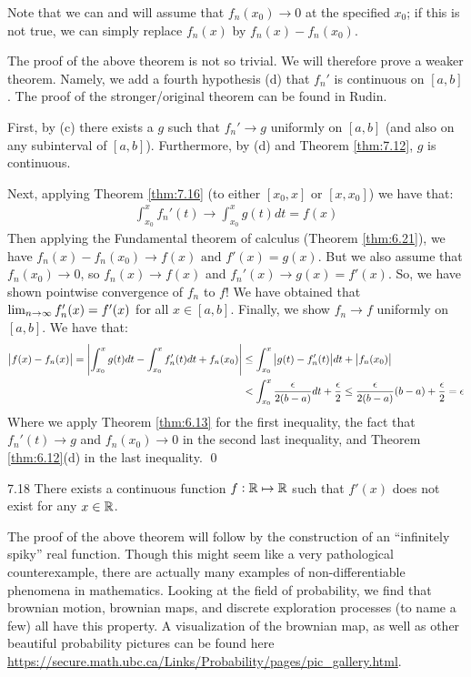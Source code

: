 Note that we can and will assume that $f_n(x_0) \rightarrow 0$ at the specified $x_0$; if this is not true, we can simply replace $f_n(x)$ by $f_n(x) - f_n(x_0)$.

\begin{nproof}
    The proof of the above theorem is not so trivial. We will therefore prove a weaker theorem. Namely, we add a fourth hypothesis (d) that $f_n'$ is continuous on $[a, b]$. The proof of the stronger/original theorem can be found in Rudin.
    
    First, by (c) there exists a $g$ such that $f_n' \rightarrow g$ uniformly on $[a, b]$ (and also on any subinterval of $[a, b]$). Furthermore, by (d) and Theorem \ref{thm:7.12}, $g$ is continuous. 
    
    Next, applying Theorem \ref{thm:7.16} (to either $[x_0, x]$ or $[x, x_0]$) we have that:
    \begin{align*}
        \int_{x_0}^x f_n'(t) \rightarrow \int_{x_0}^x g(t) dt = f(x)
    \end{align*}
    Then applying the Fundamental theorem of calculus (Theorem \ref{thm:6.21}), we have $f_n(x) - f_n(x_0) \rightarrow f(x) \text{ and } f'(x) = g(x)$. But we also assume that $f_n(x_0) \rightarrow 0$, so $f_n(x) \rightarrow f(x)$ and $f_n'(x) \rightarrow g(x) = f'(x)$. So, we have shown pointwise convergence of $f_n$ to $f$! We have obtained that $\lim_{n \rightarrow \infty} f_n'(x) = f'(x)$ for all $x \in [a, b]$. Finally, we show $f_n \rightarrow f$ uniformly on $[a, b]$. We have that:
    \begin{align*}
        \abs{f(x) - f_n(x)} = \abs{\int_{x_0}^x g(t)dt - \int_{x_0}^x f_n'(t) dt + f_n(x_0)} &\leq \int_{x_0}^x \abs{g(t) - f_n'(t)}dt + \abs{f_n(x_0)}
        \\ &< \int_{x_0}^x \frac{\epsilon}{2(b-a)}dt + \frac{\epsilon}{2} \leq \frac{\epsilon}{2(b-a)}(b-a) + \frac{\epsilon}{2} = \epsilon
    \end{align*}
    Where we apply Theorem \ref{thm:6.13} for the first inequality, the fact that $f_n'(t) \rightarrow g$ and $f_n(x_0) \rightarrow 0$ in the second last inequality, and Theorem \ref{thm:6.12}(d) in the last inequality. \qed
\end{nproof}

\begin{theorem}{}{7.18}
    There exists a continuous function $f: \mathbb{R} \mapsto \mathbb{R}$ such that $f'(x)$ does not exist for any $x \in \mathbb{R}$.
\end{theorem}

\noindent The proof of the above theorem will follow by the construction of an ``infinitely spiky'' real function. Though this might seem like a very pathological counterexample, there are actually many examples of non-differentiable phenomena in mathematics. Looking at the field of probability, we find that brownian motion, brownian maps, and discrete exploration processes (to name a few) all have this property. A visualization of the brownian map, as well as other beautiful probability pictures can be found here \url{https://secure.math.ubc.ca/Links/Probability/pages/pic_gallery.html}.

